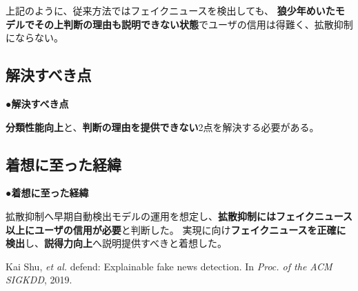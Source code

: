 {	上記のように、従来⽅法ではフェイクニュースを検出しても、
	\textbf{狼少年めいたモデルでその上判断の理由も説明できない状態}でユーザの信用は得難く、拡散抑制にならない。

	\subsection{解決すべき点}
	\noindent
	●\textbf{解決すべき点}

	\textbf{分類性能向上}と、\textbf{判断の理由を提供できない}2点を解決する必要がある。

	\subsection{着想に至った経緯}
	\noindent
	●\textbf{着想に至った経緯}

	拡散抑制へ早期自動検出モデルの運用を想定し、\textbf{拡散抑制にはフェイクニュース以上にユーザの信用が必要}と判断した。
	実現に向け\textbf{フェイクニュースを正確に検出}し、\textbf{説得力向上}へ説明提供すべきと着想した。

	{\footnotesize
		\begin{thebibliography}{99}
			\vspace*{-1mm}
			\setlength{\parskip}{0cm}
			\setlength{\itemsep}{0cm}
			\setcounter{enumiv}{6}
			\begin{spacing}{0.7}
				 Kai Shu, \textit{et al.} defend: Explainable fake news detection. In \textit{Proc. of the ACM SIGKDD}, 2019.
			\end{spacing}
			\end{thebibliography}
			
	}
}

